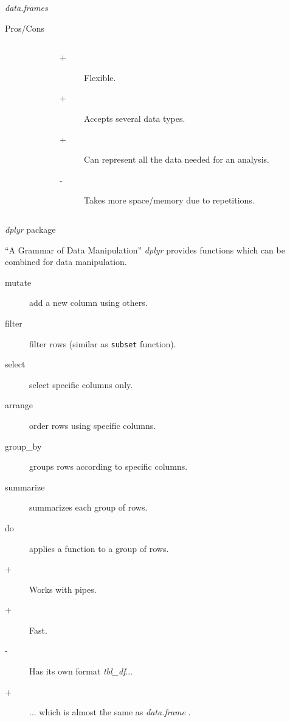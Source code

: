 \documentclass[10pt]{beamer}
\newcommand{\df}{{\it data.frame} }
\newcommand{\dfs}{{\it data.frames} }
\begin{document}
\begin{frame}[fragile, shrink=19]{\dfs}
\begin{block}{Pros/Cons}
\begin{columns}
\begin{column}{.5\textwidth}
      \end{column}
      \begin{column}{.5\textwidth}
        \begin{description}
        \item[+] Flexible.
        \item[+] Accepts several data types.
        \item[+] Can represent all the data needed for an analysis.
        \item[-] Takes more space/memory due to repetitions.
        \end{description}
      \end{column}
    \end{columns}
  \end{block}
\end{frame}

\begin{frame}[fragile]{{\it dplyr} package}
  \begin{block}{``A Grammar of Data Manipulation''}
    {\it dplyr} provides functions which can be combined for data manipulation.
    \begin{description}
    \item[mutate] add a new column using others.
    \item[filter] filter rows (similar as \verb!subset! function).
    \item[select] select specific columns only.
    \item[arrange] order rows using specific columns.
    \item[group\_by] groups rows according to specific columns.
    \item[summarize] summarizes each group of rows.
    \item[do] applies a function to a group of rows.
    \end{description}
  \end{block}
  \begin{block}{}
    \begin{description}
      \item[+] Works with pipes.
      \item[+] Fast.
      \item[-] Has its own format {\it tbl\_df}...
      \item[+] ... which is almost the same as \df.
    \end{description}
  \end{block}
\end{frame}
\end{document}
